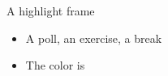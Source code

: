 \begin{highlightframe}{A highlight frame}
	\begin{itemize}
		\item A poll, an exercise, a break
		\item The color is 
	\end{itemize}
\end{highlightframe}
